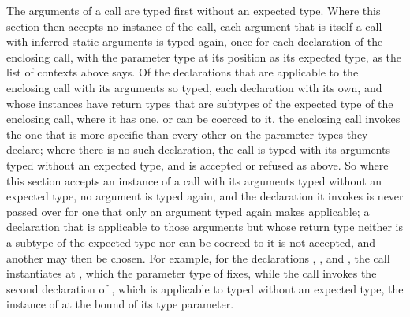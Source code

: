 The arguments of a call are typed first without an expected type.
Where this section then accepts no instance of the call, each argument that is
itself a call with inferred static arguments is typed again, once
for each declaration of the enclosing call, with the parameter type at its
position as its expected type, as the list of contexts above says.
Of the declarations that are applicable to the enclosing call with its
arguments so typed, each declaration with its own, and whose instances have
return types that are subtypes of the expected type of the enclosing call,
where it has one, or can be coerced to it, the enclosing call invokes the one
that is more specific than every other on the parameter types they declare;
where there is no such declaration, the call is typed with its arguments typed
without an expected type, and is accepted or refused as above.
So where this section accepts an instance of a call with its arguments typed
without an expected type, no argument is typed again, and the declaration it
invokes is never passed over for one that only an argument typed again makes
applicable; a declaration that is applicable to those arguments but whose
return type neither is a subtype of the expected type nor can be coerced to it
is not accepted, and another may then be chosen.
For example, for the declarations
,
,
 and
, the call 
instantiates  at , which the parameter type of
 fixes, while the call  invokes the
second declaration of , which is applicable to  typed
without an expected type, the instance of  at the bound of its type
parameter.

